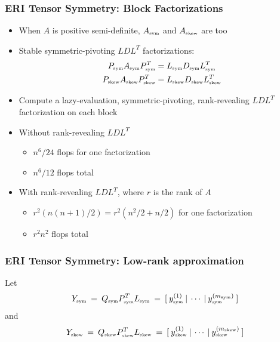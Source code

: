 \documentclass[bigger]{beamer}
\begin{document}
\begin{frame}
\frametitle{ERI Tensor Symmetry: Block Factorizations}
\label{sec-1-22}
\begin{itemize}

\item When $A$ is positive semi-definite, $A_{\mbox{\tiny sym}}$ and $A_{\mbox{\tiny skew}}$ are too
\label{sec-1-22-1}%

\item Stable symmetric-pivoting $LDL^{T}$ factorizations:
\label{sec-1-22-2}%
\begin{align*}
P_{\mbox{\tiny sym}}A_{\mbox{\tiny sym}}P_{\mbox{\tiny sym}}^{T}  &=  L_{\mbox{\tiny sym}}D_{\mbox{\tiny sym}}L_{\mbox{\tiny sym}}^{T}\\
P_{\mbox{\tiny skew}}A_{\mbox{\tiny skew}}P_{\mbox{\tiny skew}}^{T}  &=  L_{\mbox{\tiny skew}}D_{\mbox{\tiny skew}}L_{\mbox{\tiny skew}}^{T}
\end{align*}

\item Compute a lazy-evaluation, symmetric-pivoting, rank-revealing $LDL^T$ factorization on each block
\label{sec-1-22-3}%

\item Without rank-revealing $LDL^T$
\label{sec-1-22-4}%
\begin{itemize}

\item $n^6/24$ flops for one factorization
\label{sec-1-22-4-1}%

\item $n^6/12$ flops total
\label{sec-1-22-4-2}%
\end{itemize} %

\item With rank-revealing $LDL^T$, where $r$ is the rank of $A$
\label{sec-1-22-5}%
\begin{itemize}

\item $r^2(n(n+1)/2)=r^2(n^2/2+n/2)$ for one factorization
\label{sec-1-22-5-1}%

\item $r^2n^2$ flops total
\label{sec-1-22-5-2}%
\end{itemize} %
\end{itemize} %
\end{frame}
\begin{frame}
\frametitle{ERI Tensor Symmetry: Low-rank approximation}
\label{sec-1-23}

Let
\[
Y_{\mbox{\tiny sym}} \:=\: Q_{\mbox{\tiny sym}}P_{\mbox{\tiny sym}}^{T}L_{\mbox{\tiny sym}} \:=\: [ \:y^{(1)}_{\mbox{\tiny sym}} \:| \: \cdots \:|\:y_{\mbox{\tiny sym}}^{(m_{\mbox{\tiny sym}})} \:]
\]
and
\[
Y_{\mbox{\tiny skew}} \:=\: Q_{\mbox{\tiny skew}}P_{\mbox{\tiny skew}}^{T}L_{\mbox{\tiny skew}} \:=\: [ \:y^{(1)}_{\mbox{\tiny skew}} \:| \: \cdots \:|\:y_{\mbox{\tiny skew}}^{(m_{\mbox{\tiny skew}})} \:]
\]
\end{frame}
\end{document}
